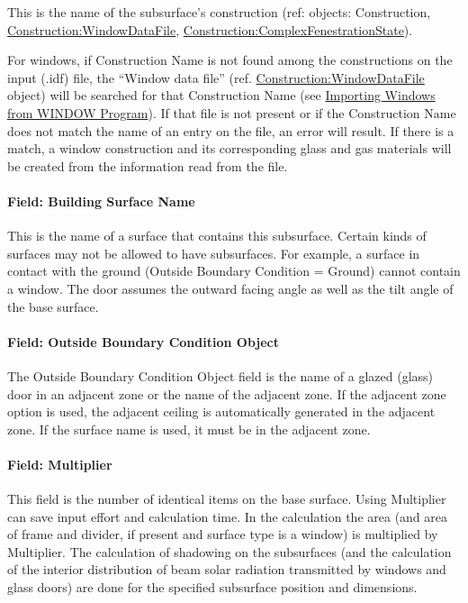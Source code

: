 This is the name of the subsurface's construction (ref: objects: Construction, \hyperref[constructionwindowdatafile]{Construction:WindowDataFile}, \hyperref[constructioncomplexfenestrationstate]{Construction:ComplexFenestrationState}).

For windows, if Construction Name is not found among the constructions on the input (.idf) file, the ``Window data file'' (ref. \hyperref[constructionwindowdatafile]{Construction:WindowDataFile} object) will be searched for that Construction Name (see \hyperref[importing-windows-from-window-program]{Importing Windows from WINDOW Program}). If that file is not present or if the Construction Name does not match the name of an entry on the file, an error will result. If there is a match, a window construction and its corresponding glass and gas materials will be created from the information read from the file.

\paragraph{Field: Building Surface Name}\label{field-building-surface-name-5}

This is the name of a surface that contains this subsurface. Certain kinds of surfaces may not be allowed to have subsurfaces. For example, a surface in contact with the ground (Outside Boundary Condition = Ground) cannot contain a window. The door assumes the outward facing angle as well as the tilt angle of the base surface.

\paragraph{Field: Outside Boundary Condition Object}\label{field-outside-boundary-condition-object-5}

The Outside Boundary Condition Object field is the name of a glazed (glass) door in an adjacent zone or the name of the adjacent zone. If the adjacent zone option is used, the adjacent ceiling is automatically generated in the adjacent zone. If the surface name is used, it must be in the adjacent zone.

\paragraph{Field: Multiplier}\label{field-multiplier-6}

This field is the number of identical items on the base surface. Using Multiplier can save input effort and calculation time. In the calculation the area (and area of frame and divider, if present and surface type is a window) is multiplied by Multiplier. The calculation of shadowing on the subsurfaces (and the calculation of the interior distribution of beam solar radiation transmitted by windows and glass doors) are done for the specified subsurface position and dimensions.


